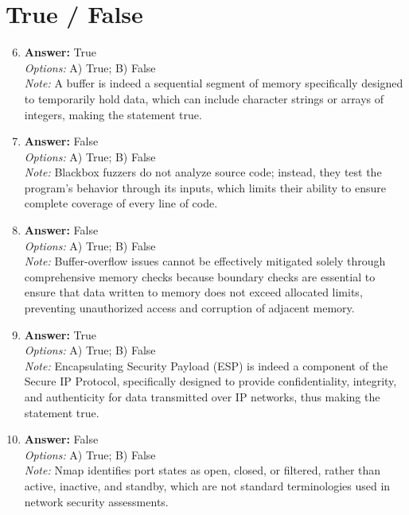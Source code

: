 \documentclass[12pt]{article}
\begin{document}
\section*{True / False}
\begin{enumerate}[label=\arabic*.]
\setcounter{enumi}{5}
\item \textbf{Answer:} True
\\ \textit{Options:} A) True; B) False
\\ \textit{Note:} A buffer is indeed a sequential segment of memory specifically designed to temporarily hold data, which can include character strings or arrays of integers, making the statement true.
\item \textbf{Answer:} False
\\ \textit{Options:} A) True; B) False
\\ \textit{Note:} Blackbox fuzzers do not analyze source code; instead, they test the program's behavior through its inputs, which limits their ability to ensure complete coverage of every line of code.
\item \textbf{Answer:} False
\\ \textit{Options:} A) True; B) False
\\ \textit{Note:} Buffer-overflow issues cannot be effectively mitigated solely through comprehensive memory checks because boundary checks are essential to ensure that data written to memory does not exceed allocated limits, preventing unauthorized access and corruption of adjacent memory.
\item \textbf{Answer:} True
\\ \textit{Options:} A) True; B) False
\\ \textit{Note:} Encapsulating Security Payload (ESP) is indeed a component of the Secure IP Protocol, specifically designed to provide confidentiality, integrity, and authenticity for data transmitted over IP networks, thus making the statement true.
\item \textbf{Answer:} False
\\ \textit{Options:} A) True; B) False
\\ \textit{Note:} Nmap identifies port states as open, closed, or filtered, rather than active, inactive, and standby, which are not standard terminologies used in network security assessments.
\end{enumerate}
\end{document}
